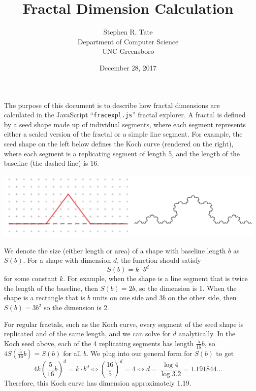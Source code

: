 \documentclass[11pt]{article}
\begin{document}
\title{Fractal Dimension Calculation}
\author{Stephen R. Tate\\Department of Computer Science\\UNC Greensboro}
\date{December 28, 2017}

\maketitle

The purpose of this document is to describe how fractal dimensions are
calculated in the JavaScript ``\texttt{fracexpl.js}'' fractal
explorer. A fractal is defined by a seed shape made up of individual
segments, where each segment represents either a scaled version of the
fractal or a simple line segment. For example, the seed shape on the
left below defines the Koch curve (rendered on the right), where each
segment is a replicating segment of length 5, and the length of the
baseline (the dashed line) is 16.

\begin{center}
\includegraphics[scale=0.9]{kochexample.pdf}
\end{center}
We denote the size (either
length or area) of a shape with baseline length $b$ as $S(b)$. For a
shape with dimension $d$, the function should satisfy
\[ S(b)= k\cdot b^d \]
for some constant $k$.
For example, when the shape is a line segment that is twice the length
of the baseline, then $S(b)=2b$, so the dimension is 1. When the shape
is a rectangle that is $b$ units on one side and $3b$ on the other
side, then $S(b)=3b^2$ so the dimension is 2.

For regular fractals, such as the Koch curve, every segment of the
seed shape is replicated and of the same length, and we can solve for
$d$ analytically. In the Koch seed above, each of the 4 replicating
segments has length $\frac{5}{16} b$, so
$4 S(\frac{5}{16} b) = S(b)$ for all $b$.  We plug into our
general form for $S(b)$ to get
\[ 4 k \left(\frac{5}{16} b\right)^d = k\cdot b^d
\iff \left(\frac{16}{5}\right)^d = 4 \iff d = \frac{\log 4}{\log 3.2} = 1.191844...
\]
Therefore, this Koch curve has dimension approximately 1.19.
\end{document}
